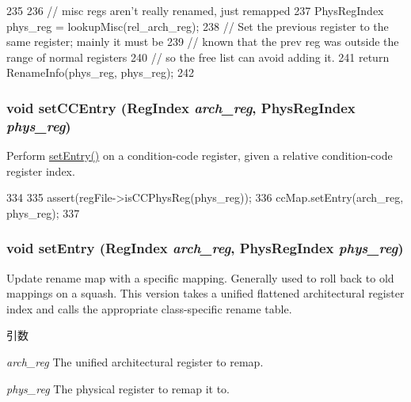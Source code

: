 \begin{DoxyCode}
235     {
236         // misc regs aren't really renamed, just remapped
237         PhysRegIndex phys_reg = lookupMisc(rel_arch_reg);
238         // Set the previous register to the same register; mainly it must be
239         // known that the prev reg was outside the range of normal registers
240         // so the free list can avoid adding it.
241         return RenameInfo(phys_reg, phys_reg);
242     }
\end{DoxyCode}
\hypertarget{classUnifiedRenameMap_a3d65458af1654ac17ee2ddf445858ba2}{
\subsubsection[{setCCEntry}]{\setlength{\rightskip}{0pt plus 5cm}void setCCEntry ({\bf RegIndex} {\em arch\_\-reg}, \/  {\bf PhysRegIndex} {\em phys\_\-reg})}}
\label{classUnifiedRenameMap_a3d65458af1654ac17ee2ddf445858ba2}
Perform \hyperlink{classUnifiedRenameMap_a5c6cad04be83122ff38650d859fbf1d8}{setEntry()} on a condition-\/code register, given a relative condition-\/code register index. 


\begin{DoxyCode}
334     {
335         assert(regFile->isCCPhysReg(phys_reg));
336         ccMap.setEntry(arch_reg, phys_reg);
337     }
\end{DoxyCode}
\hypertarget{classUnifiedRenameMap_a5c6cad04be83122ff38650d859fbf1d8}{
\subsubsection[{setEntry}]{\setlength{\rightskip}{0pt plus 5cm}void setEntry ({\bf RegIndex} {\em arch\_\-reg}, \/  {\bf PhysRegIndex} {\em phys\_\-reg})}}
\label{classUnifiedRenameMap_a5c6cad04be83122ff38650d859fbf1d8}
Update rename map with a specific mapping. Generally used to roll back to old mappings on a squash. This version takes a unified flattened architectural register index and calls the appropriate class-\/specific rename table. 
\begin{DoxyParams}{引数}
\item[{\em arch\_\-reg}]The unified architectural register to remap. \item[{\em phys\_\-reg}]The physical register to remap it to. \end{DoxyParams}



